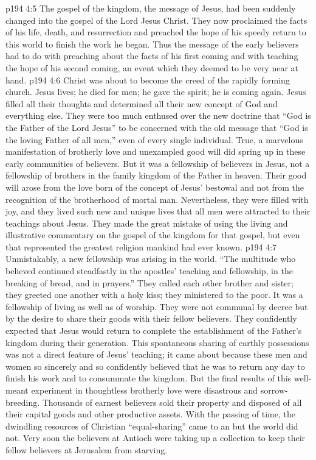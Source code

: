 \vs p194 4:5 The gospel of the kingdom, the message of Jesus, had been suddenly changed into the gospel of the Lord Jesus Christ. They now proclaimed the facts of his life, death, and resurrection and preached the hope of his speedy return to this world to finish the work he began. Thus the message of the early believers had to do with preaching about the facts of his first coming and with teaching the hope of his second coming, an event which they deemed to be very near at hand.
\vs p194 4:6 Christ was about to become the creed of the rapidly forming church. Jesus lives; he died for men; he gave the spirit; he is coming again. Jesus filled all their thoughts and determined all their new concept of God and everything else. They were too much enthused over the new doctrine that “God is the Father of the Lord Jesus” to be concerned with the old message that “God is the loving Father of all men,” even of every single individual. True, a marvelous manifestation of brotherly love and unexampled good will did spring up in these early communities of believers. But it was a fellowship of believers in Jesus, not a fellowship of brothers in the family kingdom of the Father in heaven. Their good will arose from the love born of the concept of Jesus’ bestowal and not from the recognition of the brotherhood of mortal man. Nevertheless, they were filled with joy, and they lived such new and unique lives that all men were attracted to their teachings about Jesus. They made the great mistake of using the living and illustrative commentary on the gospel of the kingdom for that gospel, but even that represented the greatest religion mankind had ever known.
\vs p194 4:7 Unmistakably, a new fellowship was arising in the world. “The multitude who believed continued steadfastly in the apostles’ teaching and fellowship, in the breaking of bread, and in prayers.” They called each other brother and sister; they greeted one another with a holy kiss; they ministered to the poor. It was a fellowship of living as well as of worship. They were not communal by decree but by the desire to share their goods with their fellow believers. They confidently expected that Jesus would return to complete the establishment of the Father’s kingdom during their generation. This spontaneous sharing of earthly possessions was not a direct feature of Jesus’ teaching; it came about because these men and women so sincerely and so confidently believed that he was to return any day to finish his work and to consummate the kingdom. But the final results of this well\hyp{}meant experiment in thoughtless brotherly love were disastrous and sorrow\hyp{}breeding. Thousands of earnest believers sold their property and disposed of all their capital goods and other productive assets. With the passing of time, the dwindling resources of Christian “equal\hyp{}sharing” came to an  but the world did not. Very soon the believers at Antioch were taking up a collection to keep their fellow believers at Jerusalem from starving.
